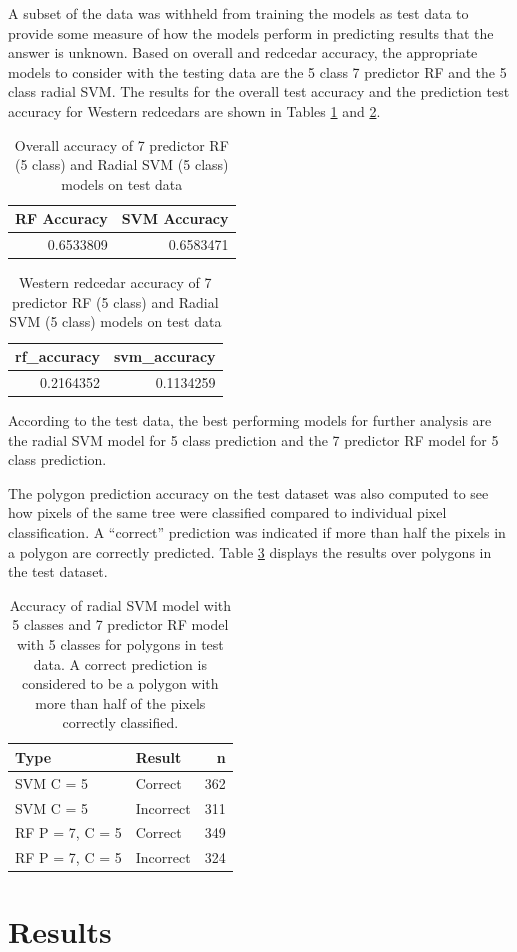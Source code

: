 \documentclass[12pt,twoside]{reedthesis}
\begin{document}
A subset of the data was withheld from training the models as test data to provide some measure of how the models perform in predicting results that the answer is unknown. Based on overall and redcedar accuracy, the appropriate models to consider with the testing data are the 5 class 7 predictor RF and the 5 class radial SVM. The results for the overall test accuracy and the prediction test accuracy for Western redcedars are shown in Tables \ref{tab:resultsTest} and \ref{tab:resultsTest2}.
\begin{table}

\caption{\label{tab:resultsTest}Overall accuracy of 7 predictor RF (5 class) and Radial SVM (5 class) models on test data}
\centering
\begin{tabular}[t]{r|r}
\hline
RF Accuracy & SVM Accuracy\\
\hline
0.6533809 & 0.6583471\\
\hline
\end{tabular}
\end{table}
\begin{table}

\caption{\label{tab:resultsTest2}Western redcedar accuracy of 7 predictor RF (5 class) and Radial SVM (5 class) models on test data}
\centering
\begin{tabular}[t]{r|r}
\hline
rf\_accuracy & svm\_accuracy\\
\hline
0.2164352 & 0.1134259\\
\hline
\end{tabular}
\end{table}
According to the test data, the best performing models for further analysis are the radial SVM model for 5 class prediction and the 7 predictor RF model for 5 class prediction.

The polygon prediction accuracy on the test dataset was also computed to see how pixels of the same tree were classified compared to individual pixel classification. A ``correct'' prediction was indicated if more than half the pixels in a polygon are correctly predicted. Table \ref{tab:polyTab} displays the results over polygons in the test dataset.
\begin{table}

\caption{\label{tab:polyTab}Accuracy of radial SVM model with 5 classes and 7 predictor RF model with 5 classes for polygons in test data. A correct prediction is considered to be a polygon with more than half of the pixels correctly classified.}
\centering
\begin{tabular}[t]{l|l|r}
\hline
Type & Result & n\\
\hline
SVM C = 5 & Correct & 362\\
\hline
SVM C = 5 & Incorrect & 311\\
\hline
RF P = 7, C = 5 & Correct & 349\\
\hline
RF P = 7, C = 5 & Incorrect & 324\\
\hline
\end{tabular}
\end{table}
\hypertarget{results}{%
\chapter{Results}\label{results}}
\end{document}
